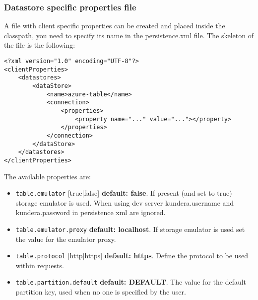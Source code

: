 \subsubsection{Datastore specific properties file}
A file with client specific properties can be created and placed inside the classpath, you need to specify its name in the persistence.xml file.
The skeleton of the file is the following:

\begin{verbatim}
<?xml version="1.0" encoding="UTF-8"?>
<clientProperties>
    <datastores>
        <dataStore>
            <name>azure-table</name>
            <connection>
                <properties>
                    <property name="..." value="..."></property>
                </properties>
            </connection>
        </dataStore>
    </datastores>
</clientProperties>
\end{verbatim}

\noindent The available properties are:
\begin{itemize}
\item \texttt{table.emulator} [true|false] \textbf{default: false}. If present (and set to true) storage emulator is used. When using dev server kundera.username and kundera.password in persistence xml are ignored.
\item \texttt{table.emulator.proxy} \textbf{default: localhost}. If storage emulator is used set the value for the emulator proxy.
\item \texttt{table.protocol} [http|https] \textbf{default: https}. Define the protocol to be used within requests.
\item \texttt{table.partition.default} \textbf{default: DEFAULT}.
The value for the default partition key, used when no one is specified by the user.
\end{itemize}